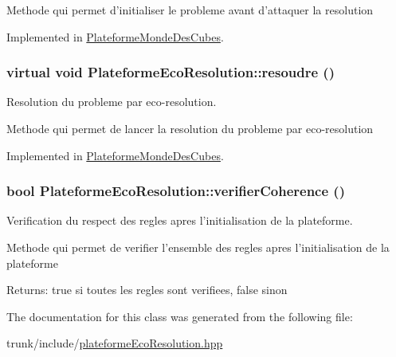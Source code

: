Methode qui permet d'initialiser le probleme avant d'attaquer la resolution 

Implemented in \hyperlink{classPlateformeMondeDesCubes_67160be6f5ecd0b8f3fffeb1a7bd81ba}{PlateformeMondeDesCubes}.\hypertarget{classPlateformeEcoResolution_17f587580cd8aee537551bc0ddd82bef}{
\subsubsection[{resoudre}]{\setlength{\rightskip}{0pt plus 5cm}virtual void PlateformeEcoResolution::resoudre ()}}
\label{classPlateformeEcoResolution_17f587580cd8aee537551bc0ddd82bef}


Resolution du probleme par eco-resolution. 

Methode qui permet de lancer la resolution du probleme par eco-resolution 

Implemented in \hyperlink{classPlateformeMondeDesCubes_c7be18c8d02e2743e884545828cfabed}{PlateformeMondeDesCubes}.\hypertarget{classPlateformeEcoResolution_2433694ea90bac8394675aaa3c9829d3}{
\subsubsection[{verifierCoherence}]{\setlength{\rightskip}{0pt plus 5cm}bool PlateformeEcoResolution::verifierCoherence ()}}
\label{classPlateformeEcoResolution_2433694ea90bac8394675aaa3c9829d3}


Verification du respect des regles apres l'initialisation de la plateforme. 

Methode qui permet de verifier l'ensemble des regles apres l'initialisation de la plateforme

\begin{Desc}
\item[Returns:]true si toutes les regles sont verifiees, false sinon \end{Desc}


The documentation for this class was generated from the following file:\begin{CompactItemize}
\item 
trunk/include/\hyperlink{plateformeEcoResolution_8hpp}{plateformeEcoResolution.hpp}\end{CompactItemize}
